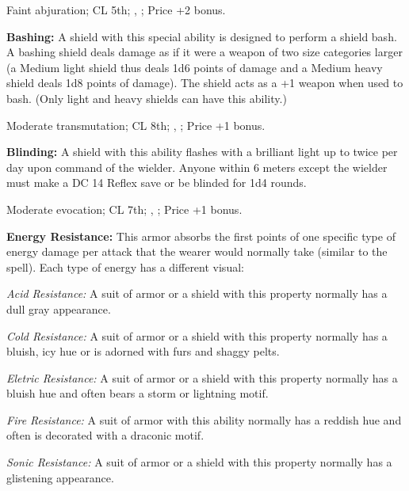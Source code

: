 Faint abjuration; CL 5th; , ; Price +2 bonus.

\textbf{Bashing:} A shield with this special ability is designed to perform a shield bash. A bashing shield deals damage as if it were a weapon of two size categories larger (a Medium light shield thus deals 1d6 points of damage and a Medium heavy shield deals 1d8 points of damage). The shield acts as a +1 weapon when used to bash. (Only light and heavy shields can have this ability.)

Moderate transmutation; CL 8th; , ; Price +1 bonus.

\textbf{Blinding:} A shield with this ability flashes with a brilliant light up to twice per day upon command of the wielder. Anyone within 6 meters except the wielder must make a DC 14 Reflex save or be blinded for 1d4 rounds.

Moderate evocation; CL 7th; , ; Price +1 bonus. 

\textbf{Energy Resistance:} This armor absorbs the first points of one specific type of energy damage per attack that the wearer would normally take (similar to the  spell). Each type of energy has a different visual:

\textit{Acid Resistance:} A suit of armor or a shield with this property normally has a dull gray appearance.

\textit{Cold Resistance:} A suit of armor or a shield with this property normally has a bluish, icy hue or is adorned with furs and shaggy pelts.

\textit{Eletric Resistance:} A suit of armor or a shield with this property normally has a bluish hue and often bears a storm or lightning motif.

\textit{Fire Resistance:} A suit of armor with this ability normally has a reddish hue and often is decorated with a draconic motif.

\textit{Sonic Resistance:} A suit of armor or a shield with this property normally has a glistening appearance.


